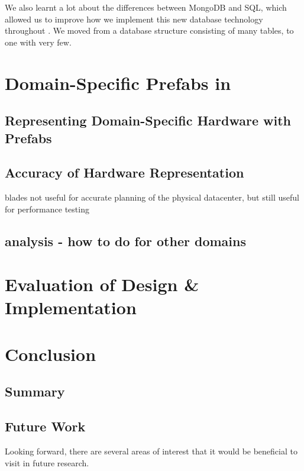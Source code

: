 \documentclass[11pt]{article}
\begin{document}
		We also learnt a lot about the differences between MongoDB and SQL, which allowed us to improve how we implement this new database technology throughout \opendc{}.
		We moved from a database structure consisting of many tables, to one with very few.


\newpage

\section{Domain-Specific Prefabs in \opendc{}}

	\subsection{Representing Domain-Specific Hardware with Prefabs}

	\subsection{Accuracy of Hardware Representation}
		blades not useful for accurate planning of the physical datacenter, but still useful for performance testing

	\subsection{analysis - how to do for other domains}


\newpage

\section{Evaluation of Design \& Implementation} \label{sec:evaluation}

\newpage

\section{Conclusion} \label{sec:conclusion}
	\subsection{Summary}
	
	\subsection{Future Work} \label{sec:future-work}
	Looking forward, there are several areas of interest that it would be beneficial to visit in future research.
\end{document}
